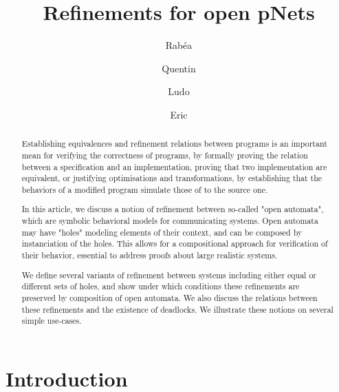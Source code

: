 \documentclass[runningheads]{llncs}
\begin{document}
%
\title{Refinements for open pNets}
%
%
\author{
Rabéa \and
Quentin \and
Ludo \and
Eric}
%
%
%
\maketitle              %
%
\begin{abstract}

Establishing equivalences and refinement relations between programs is an important mean for 
verifying the correctness of programs, by formally proving the relation between a specification and an implementation, 
proving that two implementation are equivalent, or justifying optimisations and transformations, by establishing that the
behaviors of a modified program simulate those of to the source one.

In this article, we discuss a notion of refinement between so-called "open automata", which are symbolic
behavioral models for communicating systems. Open automata may have "holes" modeling elements of their
context, and can be composed by instanciation of the holes. This allows for a compositional approach for
verification of their behavior, essential to address proofs about large realistic systems.

We define several variants of refinement between systems including either equal or different sets of holes, and 
show under which conditions these refinements are preserved by composition of open automata. We also discuss
the relations between these refinements and the existence of deadlocks.
We illustrate these notions on several simple use-cases.


\end{abstract}
%
%
%
\section{Introduction}
\end{document}
